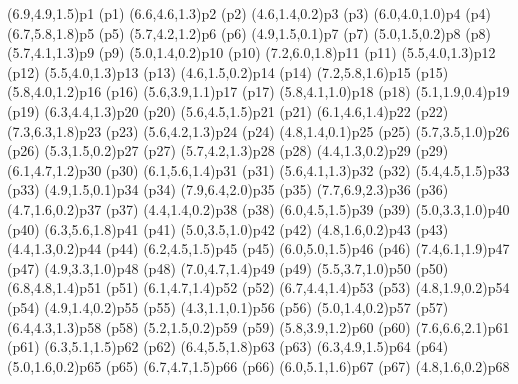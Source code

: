 \psPoint(6.9,4.9,1.5){p1}
\psdot(p1)
\psPoint(6.6,4.6,1.3){p2}
\psdot(p2)
\psPoint(4.6,1.4,0.2){p3}
\psdot(p3)
\psPoint(6.0,4.0,1.0){p4}
\psdot(p4)
\psPoint(6.7,5.8,1.8){p5}
\psdot(p5)
\psPoint(5.7,4.2,1.2){p6}
\psdot(p6)
\psPoint(4.9,1.5,0.1){p7}
\psdot(p7)
\psPoint(5.0,1.5,0.2){p8}
\psdot(p8)
\psPoint(5.7,4.1,1.3){p9}
\psdot(p9)
\psPoint(5.0,1.4,0.2){p10}
\psdot(p10)
\psPoint(7.2,6.0,1.8){p11}
\psdot(p11)
\psPoint(5.5,4.0,1.3){p12}
\psdot(p12)
\psPoint(5.5,4.0,1.3){p13}
\psdot(p13)
\psPoint(4.6,1.5,0.2){p14}
\psdot(p14)
\psPoint(7.2,5.8,1.6){p15}
\psdot(p15)
\psPoint(5.8,4.0,1.2){p16}
\psdot(p16)
\psPoint(5.6,3.9,1.1){p17}
\psdot(p17)
\psPoint(5.8,4.1,1.0){p18}
\psdot(p18)
\psPoint(5.1,1.9,0.4){p19}
\psdot(p19)
\psPoint(6.3,4.4,1.3){p20}
\psdot(p20)
\psPoint(5.6,4.5,1.5){p21}
\psdot(p21)
\psPoint(6.1,4.6,1.4){p22}
\psdot(p22)
\psPoint(7.3,6.3,1.8){p23}
\psdot(p23)
\psPoint(5.6,4.2,1.3){p24}
\psdot(p24)
\psPoint(4.8,1.4,0.1){p25}
\psdot(p25)
\psPoint(5.7,3.5,1.0){p26}
\psdot(p26)
\psPoint(5.3,1.5,0.2){p27}
\psdot(p27)
\psPoint(5.7,4.2,1.3){p28}
\psdot(p28)
\psPoint(4.4,1.3,0.2){p29}
\psdot(p29)
\psPoint(6.1,4.7,1.2){p30}
\psdot(p30)
\psPoint(6.1,5.6,1.4){p31}
\psdot(p31)
\psPoint(5.6,4.1,1.3){p32}
\psdot(p32)
\psPoint(5.4,4.5,1.5){p33}
\psdot(p33)
\psPoint(4.9,1.5,0.1){p34}
\psdot(p34)
\psPoint(7.9,6.4,2.0){p35}
\psdot(p35)
\psPoint(7.7,6.9,2.3){p36}
\psdot(p36)
\psPoint(4.7,1.6,0.2){p37}
\psdot(p37)
\psPoint(4.4,1.4,0.2){p38}
\psdot(p38)
\psPoint(6.0,4.5,1.5){p39}
\psdot(p39)
\psPoint(5.0,3.3,1.0){p40}
\psdot(p40)
\psPoint(6.3,5.6,1.8){p41}
\psdot(p41)
\psPoint(5.0,3.5,1.0){p42}
\psdot(p42)
\psPoint(4.8,1.6,0.2){p43}
\psdot(p43)
\psPoint(4.4,1.3,0.2){p44}
\psdot(p44)
\psPoint(6.2,4.5,1.5){p45}
\psdot(p45)
\psPoint(6.0,5.0,1.5){p46}
\psdot(p46)
\psPoint(7.4,6.1,1.9){p47}
\psdot(p47)
\psPoint(4.9,3.3,1.0){p48}
\psdot(p48)
\psPoint(7.0,4.7,1.4){p49}
\psdot(p49)
\psPoint(5.5,3.7,1.0){p50}
\psdot(p50)
\psPoint(6.8,4.8,1.4){p51}
\psdot(p51)
\psPoint(6.1,4.7,1.4){p52}
\psdot(p52)
\psPoint(6.7,4.4,1.4){p53}
\psdot(p53)
\psPoint(4.8,1.9,0.2){p54}
\psdot(p54)
\psPoint(4.9,1.4,0.2){p55}
\psdot(p55)
\psPoint(4.3,1.1,0.1){p56}
\psdot(p56)
\psPoint(5.0,1.4,0.2){p57}
\psdot(p57)
\psPoint(6.4,4.3,1.3){p58}
\psdot(p58)
\psPoint(5.2,1.5,0.2){p59}
\psdot(p59)
\psPoint(5.8,3.9,1.2){p60}
\psdot(p60)
\psPoint(7.6,6.6,2.1){p61}
\psdot(p61)
\psPoint(6.3,5.1,1.5){p62}
\psdot(p62)
\psPoint(6.4,5.5,1.8){p63}
\psdot(p63)
\psPoint(6.3,4.9,1.5){p64}
\psdot(p64)
\psPoint(5.0,1.6,0.2){p65}
\psdot(p65)
\psPoint(6.7,4.7,1.5){p66}
\psdot(p66)
\psPoint(6.0,5.1,1.6){p67}
\psdot(p67)
\psPoint(4.8,1.6,0.2){p68}
